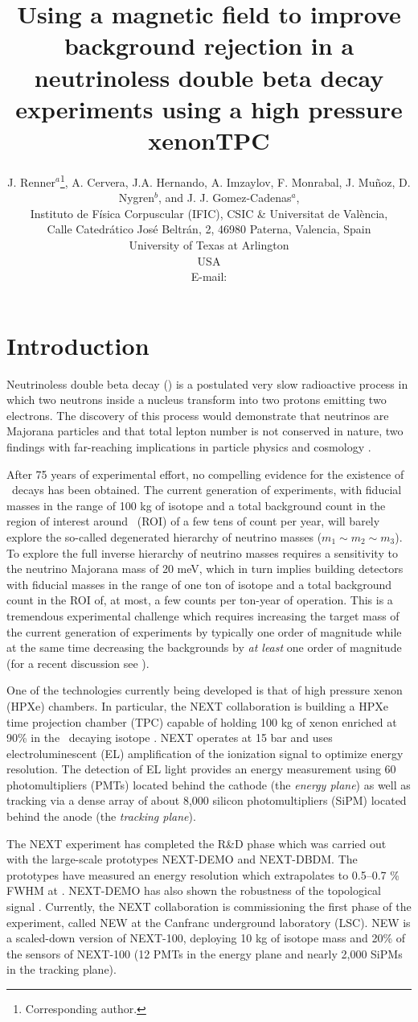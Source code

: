 \documentclass{JINST}
\title{Using a magnetic field to improve background rejection in a neutrinoless double beta decay experiments using a high pressure xenonTPC}
\author{J. Renner$^a$\thanks{Corresponding author.},
A. Cervera, J.A. Hernando, A. Imzaylov, F. Monrabal, J. Mu\~noz, D. Nygren$^b$, and J. J. Gomez-Cadenas$^a$,\\
\llap{$^a$}Instituto de F\'isica Corpuscular (IFIC), CSIC \& Universitat de Val\`encia,\\ 
Calle Catedr\'atico Jos\'e Beltr\'an, 2, 46980 Paterna, Valencia, Spain\\
\llap{$^b$}University of Texas at Arlington\\
  USA\\
E-mail: \email{jrenner@ific.uv.es}}
\begin{document}
\section{Introduction}\label{sec:intro}

Neutrinoless double beta decay (\bbonu) is a postulated very slow radioactive process in which two neutrons inside a nucleus transform into two protons emitting two electrons. The discovery of this process would demonstrate that neutrinos are Majorana particles and that total lepton number is not conserved in nature, two findings with far-reaching implications in particle physics and cosmology \cite{Gomez_2013, GomezCadenas:2013ue, Cadenas_2012}.

After 75 years of experimental effort, no compelling evidence for the existence of \bbonu\ decays has been obtained. The current generation of experiments, with fiducial masses in the range of 100 kg of isotope and a total background count in the region of interest around \Qbb\ (ROI) of a few tens of count per year, will barely explore the so-called degenerated hierarchy of neutrino masses ($m_1 \sim m_2 \sim m_3$). To explore the full inverse hierarchy of neutrino masses requires a sensitivity to the neutrino Majorana mass of 20 meV, which in turn implies building detectors with fiducial masses in the range of one ton of isotope and a total background count in the ROI of, at most, a few counts per ton-year of operation. This is a tremendous experimental challenge which requires increasing the target mass of the current generation of experiments by typically one order of magnitude while at the same time decreasing the backgrounds by {\em at least} one order of magnitude (for a recent discussion see \cite{Gomez-Cadenas:2015twa}).

One of the technologies currently being developed is that of high pressure xenon (HPXe) chambers. In particular, the NEXT collaboration \cite{Gomez-Cadenas:2014dxa} is building a HPXe time projection chamber (TPC) capable of holding 100 kg of xenon enriched at 90\% in the \bb\ decaying isotope \XE. NEXT operates at 15 bar and uses electroluminescent (EL) amplification of the ionization signal to optimize energy resolution. The detection of EL light provides an energy measurement using 60 photomultipliers (PMTs) located behind the cathode (the \emph{energy plane}) as well as tracking  via a dense array of about 8,000 silicon photomultipliers (SiPM) located behind the anode (the \emph{tracking plane}).

The NEXT experiment has completed the R\&D phase which was carried out with the large-scale prototypes NEXT-DEMO and NEXT-DBDM. The prototypes have measured an energy resolution which extrapolates to 0.5--0.7 \% FWHM at \Qbb. NEXT-DEMO has also shown the robustness of the topological signal \cite{Alvarez:2012xda,Alvarez:2012kua,Alvarez:2013gxa,Lorca:2014sra}. Currently, the NEXT collaboration is commissioning the first phase of the experiment, called NEW at the Canfranc underground laboratory (LSC). NEW is a scaled-down version of NEXT-100, deploying 10 kg of isotope mass and 20\% of the sensors of NEXT-100 (12 PMTs in the energy plane and nearly 2,000 SiPMs in the tracking plane).
\end{document}

